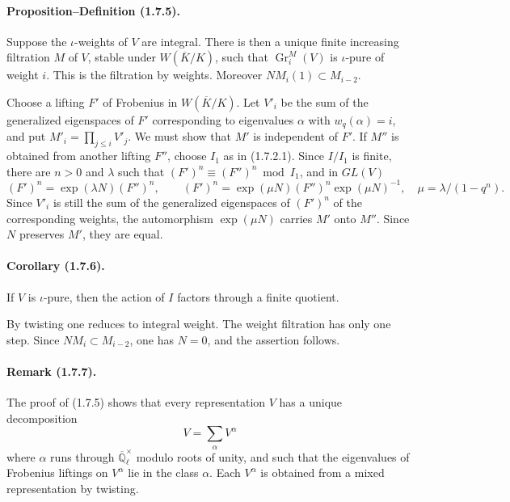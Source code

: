 \documentclass[11pt]{article}
\theoremstyle{remark}
\newcommand{\Gr}{\operatorname{Gr}}
\begin{document}
\paragraph{Proposition--Definition (1.7.5).} Suppose the $\iota$-weights of $V$ are integral. There is then a unique finite increasing filtration $M$ of $V$, stable under $W(\overline K/K)$, such that $\Gr^M_i(V)$ is $\iota$-pure of weight $i$. This is the filtration by weights. Moreover $NM_i(1)\subset M_{i-2}$.

Choose a lifting $F'$ of Frobenius in $W(\overline K/K)$. Let $V'_i$ be the sum of the generalized eigenspaces of $F'$ corresponding to eigenvalues $\alpha$ with $w_q(\alpha)=i$, and put $M'_i=\prod_{j\le i}V'_j$. We must show that $M'$ is independent of $F'$. If $M''$ is obtained from another lifting $F''$, choose $I_1$ as in (1.7.2.1). Since $I/I_1$ is finite, there are $n>0$ and $\lambda$ such that $(F')^n\equiv (F'')^n\bmod I_1$, and in $GL(V)$
\[
        (F')^n=\exp(\lambda N)(F'')^n,
        \qquad
        (F')^n=\exp(\mu N)(F'')^n\exp(\mu N)^{-1},
        \quad \mu=\lambda/(1-q^n).
\]
Since $V'_i$ is still the sum of the generalized eigenspaces of $(F')^n$ of the corresponding weights, the automorphism $\exp(\mu N)$ carries $M'$ onto $M''$. Since $N$ preserves $M'$, they are equal.

\paragraph{Corollary (1.7.6).} If $V$ is $\iota$-pure, then the action of $I$ factors through a finite quotient.

By twisting one reduces to integral weight. The weight filtration has only one step. Since $NM_i\subset M_{i-2}$, one has $N=0$, and the assertion follows.

\paragraph{Remark (1.7.7).} The proof of (1.7.5) shows that every representation $V$ has a unique decomposition
\[
        V=\sum_{\alpha}V^\alpha
\]
where $\alpha$ runs through $\overline{\mathbb Q}_\ell^{\times}$ modulo roots of unity, and such that the eigenvalues of Frobenius liftings on $V^\alpha$ lie in the class $\alpha$. Each $V^\alpha$ is obtained from a mixed representation by twisting.
\end{document}
